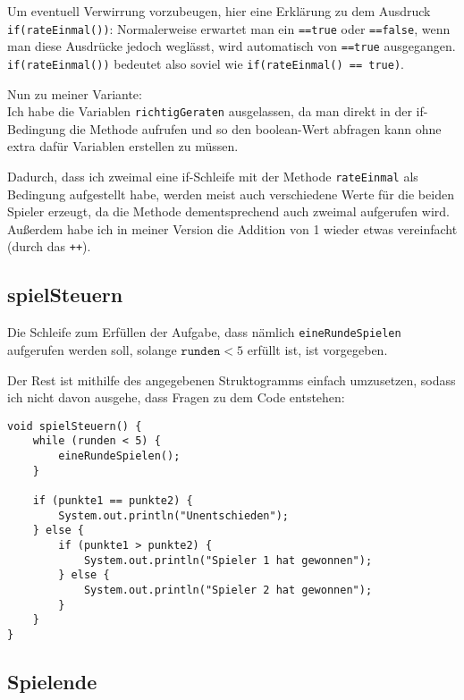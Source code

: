 \documentclass{scrartcl}   %
\begin{document}
Um eventuell Verwirrung vorzubeugen, hier eine Erklärung zu dem Ausdruck \texttt{if(rateEinmal())}:
Normalerweise erwartet man ein \texttt{==true} oder \texttt{==false}, wenn man diese Ausdrücke jedoch weglässt, wird automatisch von \texttt{==true} ausgegangen.\\
\texttt{if(rateEinmal())} bedeutet also soviel wie \texttt{if(rateEinmal() == true)}.

Nun zu meiner Variante:\\
Ich habe die Variablen \texttt{richtigGeraten} ausgelassen, da man direkt in der if-Bedingung die Methode aufrufen und so den boolean-Wert abfragen kann ohne extra dafür Variablen erstellen zu müssen.

Dadurch, dass ich zweimal eine if-Schleife mit der Methode \texttt{rateEinmal} als Bedingung aufgestellt habe, werden meist auch verschiedene Werte für die beiden Spieler erzeugt, da die Methode dementsprechend auch zweimal aufgerufen wird.\\
Außerdem habe ich in meiner Version die Addition von 1 wieder etwas vereinfacht (durch das \texttt{++}).

\newpage

\subsection{spielSteuern}

Die Schleife zum Erfüllen der Aufgabe, dass nämlich \texttt{eineRundeSpielen} aufgerufen werden soll, solange $\texttt{runden} < 5$ erfüllt ist, ist vorgegeben.

Der Rest ist mithilfe des angegebenen Struktogramms einfach umzusetzen, sodass ich nicht davon ausgehe, dass Fragen zu dem Code entstehen:\\
\begin{lstlisting}
void spielSteuern() {
    while (runden < 5) {
        eineRundeSpielen();
    }
    
    if (punkte1 == punkte2) {
        System.out.println("Unentschieden");
    } else {
        if (punkte1 > punkte2) {
            System.out.println("Spieler 1 hat gewonnen");
        } else {
            System.out.println("Spieler 2 hat gewonnen");
        }
    }
}
\end{lstlisting}

\subsection{Spielende}
\end{document}
